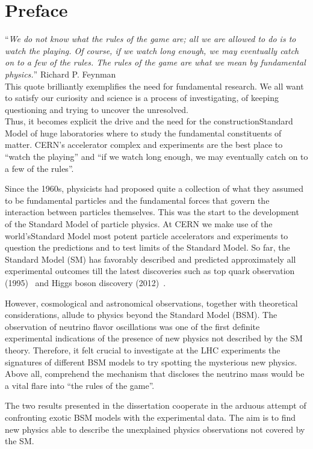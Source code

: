 \chapter*{Preface}\label{chapter:introduction}
\enquote{\itshape {\small We do not know what the rules of the game are; all we are allowed to
do is to watch the playing. Of course, if we watch long enough, we may
eventually catch on to a few of the rules. The rules of the game are
what we mean by fundamental physics.}} Richard P. Feynman\\
This quote brilliantly exemplifies the need for fundamental
research. We all want to satisfy our 
curiosity and science is a process of investigating, of keeping
questioning and trying to uncover the unresolved.\\
Thus, it becomes explicit the drive and the need for the constructionStandard Model
of huge laboratories where to study the fundamental constituents of
matter.
CERN's accelerator complex and experiments are the
best place to ``watch the playing'' and ``if we watch long enough, we may
eventually catch on to a few of the rules''.

Since the 1960s, physicists had proposed quite a collection of what
they assumed to be fundamental particles and the fundamental forces
 that govern the interaction between particles themselves. This was
 the start to the development of the Standard Model of particle
 physics. At CERN we make use of the world'sStandard Model
most potent particle accelerators and experiments to question the
predictions and to test limits of the Standard Model. So far,
the Standard Model (SM) has favorably described and predicted
approximately all experimental outcomes till the latest
discoveries such as top quark observation (1995)~\cite{Abachi_1995}
and Higgs boson discovery (2012)~\cite{20121,201230}.

However, cosmological and astronomical observations, together with theoretical
considerations, allude to physics beyond the Standard Model (BSM).
The observation of neutrino flavor oscillations was one of the first 
definite experimental indications of the
presence of new physics not described by the SM theory.
 Therefore, it felt crucial to investigate at the LHC
experiments the signatures of different BSM models
to try spotting the mysterious new physics. Above all, comprehend the
mechanism that discloses the neutrino mass would be a
vital flare into ``the rules of the game''.

The two results presented in the dissertation cooperate in the arduous attempt of confronting exotic BSM
models with the experimental data. The aim is to find new
physics able to describe the unexplained
physics observations not covered by the SM.\\

